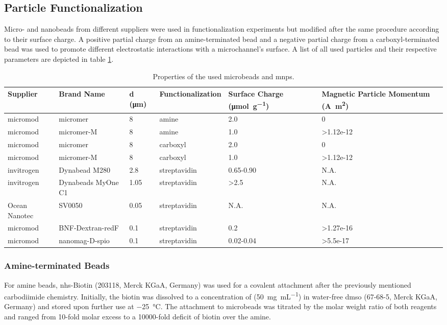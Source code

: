 \subsection{Particle Functionalization}
\label{sec:meth:particle}
Micro- and nanobeads from different suppliers were used in functionalization experiments but modified after the same procedure according to their surface charge. A positive partial charge from an \gls{amine}-terminated bead and a negative partial charge from a \gls{carboxyl}-terminated bead was used to promote different electrostatic interactions with a microchannel's surface. A list of all used particles and their respective parameters are depicted in table \ref{tab:particles}.
\begin{table}[htb]
	\normalsize
	\begin{tabularx}{\linewidth}{m{17mm}m{22mm}m{8mm}m{20mm}m{20mm}m{20mm}}
		\toprule[1pt]
		Supplier & Brand Name & d (\si{\micro\meter}) & Func\-tio\-na\-li\-za\-tion & Surface Charge (\si{\micro\mol\per\gram})  & Magnetic Particle Momentum (\si{\ampere\square\meter})\\
		\midrule
		micromod & micromer & \num{8} & \gls{amine} & \num{2.0} &  0 \\		
		micromod & micromer-M & \num{8} & \gls{amine}  & \num{1.0} & \num{>1.12e-12} \\ \addlinespace
		micromod & micromer & 8 & \gls{carboxyl} & \num{2.0} &  0\\
		micromod & micromer-M & 8 & \gls{carboxyl}  & \num{1.0} & \num{>1.12e-12}\\ \addlinespace
		invitrogen & Dynabead M280 & \num{2.8} & streptavidin & \num{.65}-\num{.90} &  N.A.\\
		invitrogen & Dynabeads MyOne C1 & \num{1.05} & streptavidin & \num{>2.5} & N.A. \\
		Ocean Nanotec &  SV0050  & \num{0.05}& streptavidin & N.A. & N.A. \\
		micromod & BNF-Dextran-redF &\num{0.1} & streptavidin &\num{0.2} & \num{>1.27e-16} \\
		micromod & nanomag-D-spio & \num{0.1} & streptavidin & \num{0.02}-\num{0.04} & \num{>5.5e-17} \\
		\bottomrule[1.2pt]
	\end{tabularx}
	\caption{Properties of the used microbeads and \glspl{mnp}.}
	\label{tab:particles}
\end{table}
\subsubsection{Amine-terminated Beads} \label{sec:meth:aminebeads}
For \gls{amine} beads, \gls{nhs}-Biotin (203118, Merck KGaA, Germany) was used for a covalent attachment after the previously mentioned carbodiimide chemistry. Initially, the biotin was dissolved to a concentration of (\SI{50}{\milli\gram\per\milli\liter}) in water-free \gls{dmso} (67-68-5, Merck KGaA, Germany) and stored upon further use at \SI{-25}{\degreeCelsius}. The attachment to microbeads was titrated by the molar weight ratio of both reagents and ranged from 10-fold molar excess to a \num{10000}-fold deficit of biotin over the amine. 

